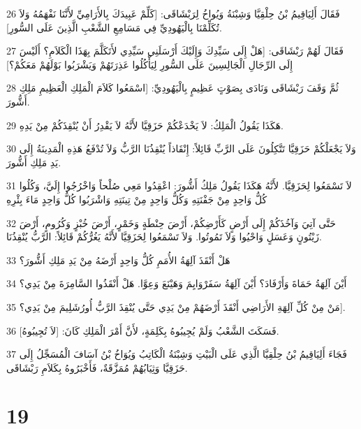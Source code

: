 \par 26 فَقَالَ أَلِيَاقِيمُ بْنُ حِلْقِيَّا وَشِبْنَةُ وَيُواخُ لِرَبْشَاقَى: [كَلِّمْ عَبِيدَكَ بِالأَرَامِيِّ لأَنَّنَا نَفْهَمُهُ وَلاَ تُكَلِّمْنَا بِالْيَهُودِيِّ فِي مَسَامِعِ الشَّعْبِ الَّذِينَ عَلَى السُّورِ].
\par 27 فَقَالَ لَهُمْ رَبْشَاقَى: [هَلْ إِلَى سَيِّدِكَ وَإِلَيْكَ أَرْسَلَنِي سَيِّدِي لأَتَكَلَّمَ بِهَذَا الْكَلاَمِ؟ أَلَيْسَ إِلَى الرِّجَالِ الْجَالِسِينَ عَلَى السُّورِ لِيَأْكُلُوا عَذِرَتَهُمْ وَيَشْرَبُوا بَوْلَهُمْ مَعَكُمْ؟]
\par 28 ثُمَّ وَقَفَ رَبْشَاقَى وَنَادَى بِصَوْتٍ عَظِيمٍ بِالْيَهُودِيِّ: [اسْمَعُوا كَلاَمَ الْمَلِكِ الْعَظِيمِ مَلِكِ أَشُّورَ.
\par 29 هَكَذَا يَقُولُ الْمَلِكُ: لاَ يَخْدَعْكُمْ حَزَقِيَّا لأَنَّهُ لاَ يَقْدِرُ أَنْ يُنْقِذَكُمْ مِنْ يَدِهِ.
\par 30 وَلاَ يَجْعَلْكُمْ حَزَقِيَّا تَتَّكِلُونَ عَلَى الرَّبِّ قَائِلاً: إِنْقَاذاً يُنْقِذُنَا الرَّبُّ وَلاَ تُدْفَعُ هَذِهِ الْمَدِينَةُ إِلَى يَدِ مَلِكِ أَشُّورَ.
\par 31 لاَ تَسْمَعُوا لِحَزَقِيَّا. لأَنَّهُ هَكَذَا يَقُولُ مَلِكُ أَشُّورَ: اعْقِدُوا مَعِي صُلْحاً وَاخْرُجُوا إِلَيَّ، وَكُلُوا كُلُّ وَاحِدٍ مِنْ جَفْنَتِهِ وَكُلُّ وَاحِدٍ مِنْ تِينَتِهِ وَاشْرَبُوا كُلُّ وَاحِدٍ مَاءَ بِئْرِهِ
\par 32 حَتَّى آتِيَ وَآخُذَكُمْ إِلَى أَرْضٍ كَأَرْضِكُمْ، أَرْضَ حِنْطَةٍ وَخَمْرٍ، أَرْضَ خُبْزٍ وَكُرُومٍ، أَرْضَ زَيْتُونٍ وَعَسَلٍ وَاحْيُوا وَلاَ تَمُوتُوا. وَلاَ تَسْمَعُوا لِحَزَقِيَّا لأَنَّهُ يَغُرُّكُمْ قَائِلاً: الرَّبُّ يُنْقِذُنَا.
\par 33 هَلْ أَنْقَذَ آلِهَةُ الأُمَمِ كُلُّ وَاحِدٍ أَرْضَهُ مِنْ يَدِ مَلِكِ أَشُّورَ؟
\par 34 أَيْنَ آلِهَةُ حَمَاةَ وَأَرْفَادَ؟ أَيْنَ آلِهَةُ سَفَرْوَايِمَ وَهَيْنَعَ وَعِوَّا. هَلْ أَنْقَذُوا السَّامِرَةَ مِنْ يَدِي؟
\par 35 مَنْ مِنْ كُلِّ آلِهَةِ الأَرَاضِي أَنْقَذَ أَرْضَهُمْ مِنْ يَدِي حَتَّى يُنْقِذَ الرَّبُّ أُورُشَلِيمَ مِنْ يَدِي؟].
\par 36 فَسَكَتَ الشَّعْبُ وَلَمْ يُجِيبُوهُ بِكَلِمَةٍ، لأَنَّ أَمْرَ الْمَلِكِ كَانَ: [لاَ تُجِيبُوهُ].
\par 37 فَجَاءَ أَلِيَاقِيمُ بْنُ حِلْقِيَّا الَّذِي عَلَى الْبَيْتِ وَشِبْنَةُ الْكَاتِبُ وَيُوَاخُ بْنُ آسَافَ الْمُسَجِّلُ إِلَى حَزَقِيَّا وَثِيَابُهُمْ مُمَزَّقَةٌ، فَأَخْبَرُوهُ بِكَلاَمِ رَبْشَاقَى.

\chapter{19}

